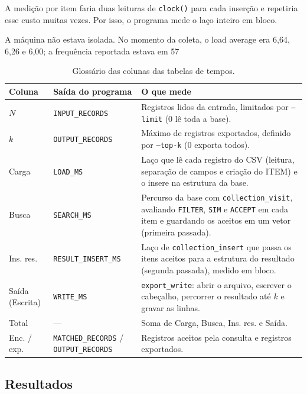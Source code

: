 \documentclass[11pt,a4paper]{article}
\newcommand{\cab}[1]{\rowcolor{gray!22}#1}
\begin{document}
A medição por item faria duas leituras de \texttt{clock()} para cada inserção e repetiria esse custo muitas vezes. Por isso, o programa mede o laço inteiro em bloco.

A máquina não estava isolada. No momento da coleta, o load average era 6,64, 6,26 e 6,00; a frequência reportada estava em 57%

\begin{table}[!htbp]
\centering
\caption{Glossário das colunas das tabelas de tempos.}
\label{tab:glossario}
\small
\begin{tabularx}{\textwidth}{@{}l l Y@{}}
\toprule
\cab{\textbf{Coluna} & \textbf{Saída do programa} & \textbf{O que mede}} \\
\midrule
$N$ & \texttt{INPUT\_RECORDS} & Registros lidos da entrada, limitados por \texttt{--limit} (0 lê toda a base). \\
$k$ & \texttt{OUTPUT\_RECORDS} & Máximo de registros exportados, definido por \texttt{--top-k} (0 exporta todos). \\
Carga & \texttt{LOAD\_MS} & Laço que lê cada registro do CSV (leitura, separação de campos e criação do ITEM) e o insere na estrutura da base. \\
Busca & \texttt{SEARCH\_MS} & Percurso da base com \texttt{collection\_visit}, avaliando \texttt{FILTER}, \texttt{SIM} e \texttt{ACCEPT} em cada item e guardando os aceitos em um vetor (primeira passada). \\
Ins. res. & \texttt{RESULT\_INSERT\_MS} & Laço de \texttt{collection\_insert} que passa os itens aceitos para a estrutura do resultado (segunda passada), medido em bloco. \\
Saída (Escrita) & \texttt{WRITE\_MS} & \texttt{export\_write}: abrir o arquivo, escrever o cabeçalho, percorrer o resultado até $k$ e gravar as linhas. \\
Total & --- & Soma de Carga, Busca, Ins. res. e Saída. \\
Enc. / exp. & \texttt{MATCHED\_RECORDS} / \texttt{OUTPUT\_RECORDS} & Registros aceitos pela consulta e registros exportados. \\
\bottomrule
\end{tabularx}
\end{table}

\subsection{Resultados}
\end{document}

